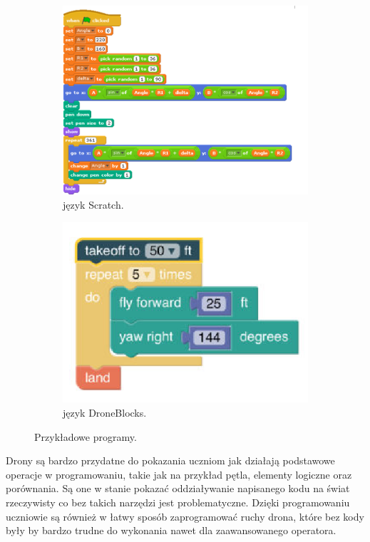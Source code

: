 \documentclass{article}
\begin{document}
\begin{figure}[h!]
  \centering
  \begin{subfigure}[b]{0.4\linewidth}
    \includegraphics[width=\linewidth]{kod2.jpg}
    \caption{język Scratch.}
  \end{subfigure}
  \begin{subfigure}[b]{0.4\linewidth}
    \includegraphics[width=\linewidth]{kod1.jpg}
    \caption{język DroneBlocks.}
  \end{subfigure}
  \caption{Przykładowe programy.}
  \label{fig:coffee}
\end{figure}

Drony są bardzo przydatne do pokazania uczniom jak działają podstawowe operacje w programowaniu, takie jak na przykład pętla, elementy logiczne oraz porównania. Są one w stanie pokazać oddziaływanie napisanego kodu na świat rzeczywisty co bez takich narzędzi jest problematyczne. 
Dzięki programowaniu uczniowie są również w łatwy sposób zaprogramować ruchy drona, które bez kody były by bardzo trudne do wykonania nawet dla zaawansowanego operatora.
\end{document}
